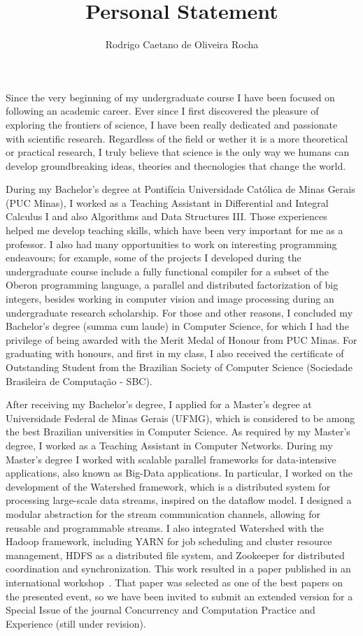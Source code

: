 \documentclass{article}
\title{Personal Statement}
\author{Rodrigo Caetano de Oliveira Rocha}
\date{}
\begin{document}
\maketitle

Since the very beginning of my undergraduate course I have been focused on
following an academic career.  Ever since I first discovered the pleasure of
exploring the frontiers of science, I have been really dedicated and passionate
with scientific research.  Regardless of the field or wether it is a more
theoretical or practical research, I truly believe that science is the only way
we humans can develop groundbreaking ideas, theories and thecnologies that
change the world.

During my Bachelor's degree at Pontif\'{i}cia Universidade Cat\'{o}lica de
Minas Gerais (PUC Minas), I worked as a Teaching Assistant in Differential and
Integral Calculus I and also Algorithms and Data Structures III. Those
experiences helped me develop teaching skills, which have been very important
for me as a professor. I also had many opportunities to work on interesting
programming endeavours; for example, some of the projects I developed during
the undergraduate course include a fully functional compiler for a subset of
the Oberon programming language, a parallel and distributed factorization of
big integers, besides working in computer vision and image processing during an
undergraduate research scholarship. For those and other reasons, I concluded my
Bachelor's degree (summa cum laude) in Computer Science, for which I had the
privilege of being awarded with the Merit Medal of Honour from PUC Minas.  For
graduating with honours, and first in my class, I also received the certificate
of Outstanding Student from the Brazilian Society of Computer Science
(Sociedade Brasileira de Computa\c{c}\~{a}o - SBC).

After receiving my Bachelor's degree, I applied for a Master's degree at
Universidade Federal de Minas Gerais (UFMG), which is considered to be among
the best Brazilian universities in Computer Science. As required by my Master's
degree, I worked as a Teaching Assistant in Computer Networks. During my
Master's degree I worked with scalable parallel frameworks for data-intensive
applications, also known as Big-Data applications. In particular, I worked on
the development of the Watershed framework, which is a distributed system for
processing large-scale data streams, inspired on the dataflow model. I designed
a modular abstraction for the stream communication channels, allowing for
reusable and programmable streams. I also integrated Watershed with the Hadoop
framework, including YARN for job scheduling and cluster resource management,
HDFS as a distributed file system, and Zookeeper for distributed coordination
and synchronization. This work resulted in a paper published in an
international workshop~\cite{rocha2014watershed}. That paper was selected as
one of the best papers on the presented event, so we have been invited to
submit an extended version for a Special Issue of the journal Concurrency and
Computation Practice and Experience (still under revision).
\end{document}
